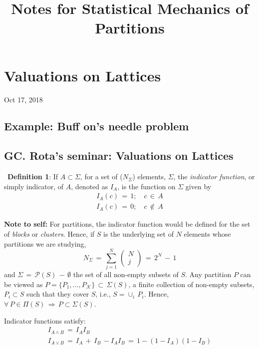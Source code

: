 \documentclass[12pt]{amsart}
\title{Notes for Statistical Mechanics of Partitions}
\author{}
\date{} %
\begin{document}
\maketitle

\section{Valuations on Lattices}
Oct 17, 2018

\subsection{Example: Buff	on's needle problem}
\subsection{GC. Rota's seminar\cite{GCRota97}:  Valuations on Lattices}
$\,$\linebreak 
{\bf Definition 1}: If $A\subset \Sigma$, for a set of ($N_\Sigma$) elements, $\Sigma$, the {\sl indicator function},
or simply indicator, of $A$, denoted as $I_A$, is the function on $\Sigma$ given by
\[
\begin{array}{c}
I_A(c) \,=\,1;\quad c\,\in\,A 
\\
I_A(c) \,=\,0;\quad c\,\notin\,A 
\end{array}
\]

{\bf Note to self:} For partitions, the indicator function would be defined for the set of {\sl blocks} or
{\sl clusters}. Hence, if $S$ is the underlying set of $N$ elements whose partitions we are studying, 
\[
N_\Sigma\,=\,\sum_{j=1}^N\,\left(\begin{array}{c}N\\j\end{array}\right)\,=\,2^N\,-\,1
\]
and $\Sigma\,=\, \mathcal{P} (S)\,-\,\emptyset$ the set of all non-empty subsets of $S$. Any partition $P$ can be viewed as $P=\{P_1,\dots,P_\mathcal{K}\}\,\subset\,\Sigma(S)$, a finite collection of non-empty subsets, $P_i \subset S$ such that they cover $S$, i.e., $S=\cup_i\,P_i$. 
Hence, $\forall\, P\in\Pi(S)\,\Rightarrow \,P\subset \Sigma(S)$.

Indicator functions satisfy:
\[
\begin{array}{c}
I_{A\wedge B}\,=\,I_AI_B\\
I_{A\vee B}\,=\,I_A\,+\,I_B\,-I_AI_B\,=\,1-(1-I_A)(1-I_B)
\end{array}
\]
\end{document}

